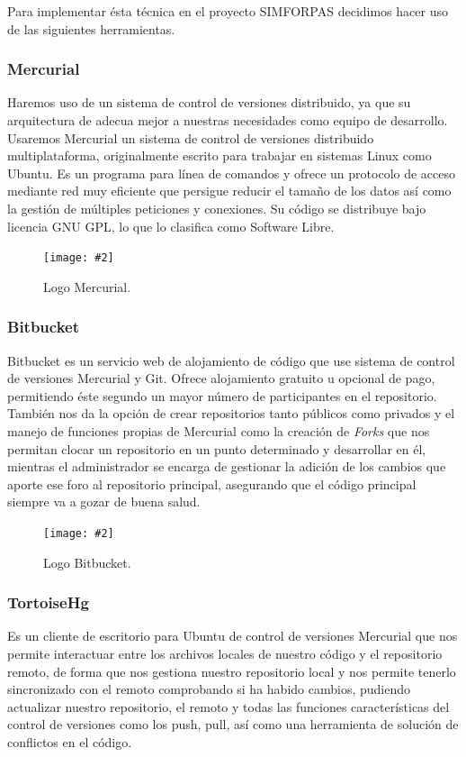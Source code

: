 \documentclass[12pt,a4paper,spanish]{book} %
\newcommand{\imgCentradaPeq}[3]{
\begin{figure}[H]
\begin{center}
\texttt{[image: \#2]}
\caption{#3}
\label{#1}
\end{center}
\end{figure}
}
\begin{document}
Para implementar ésta técnica en el proyecto SIMFORPAS decidimos hacer uso de las siguientes herramientas.

\subsubsection{Mercurial}

Haremos uso de un sistema de control de versiones distribuido, ya que su arquitectura de adecua mejor a nuestras necesidades como equipo de desarrollo. Usaremos Mercurial un sistema de control de versiones distribuido multiplataforma, originalmente escrito para trabajar en sistemas Linux como Ubuntu. Es un programa para línea de comandos y ofrece un protocolo de acceso mediante red muy eficiente que persigue reducir el tamaño de los datos así como la gestión de múltiples peticiones y conexiones. Su código se distribuye bajo licencia GNU GPL, lo que lo clasifica como Software Libre.

\imgCentradaPeq{fig.2.12}{img/mercurial.eps}{Logo Mercurial.}

\newpage
\subsubsection{Bitbucket}

Bitbucket es un servicio web de alojamiento de código que use sistema de control de versiones Mercurial y Git. Ofrece alojamiento gratuito u opcional de pago, permitiendo éste segundo un mayor número de participantes en el repositorio. También nos da la opción de crear repositorios tanto públicos como privados y el manejo de funciones propias de Mercurial como la creación de \emph{Forks} que nos permitan clocar un repositorio en un punto determinado y desarrollar en él, mientras el administrador se encarga de gestionar la adición de los cambios que aporte ese foro al repositorio principal, asegurando que el código principal siempre va a gozar de buena salud.

\imgCentradaPeq{fig.2.13}{img/bitbucket.eps}{Logo Bitbucket.}

\subsubsection{TortoiseHg}

Es un cliente de escritorio para Ubuntu de control de versiones Mercurial que nos permite interactuar entre los archivos locales de nuestro código y el repositorio remoto, de forma que nos gestiona nuestro repositorio local y nos permite tenerlo sincronizado con el remoto comprobando si ha habido cambios, pudiendo actualizar nuestro repositorio, el remoto y todas las funciones características del control de versiones como los push, pull, así como una herramienta de solución de conflictos en el código.
\end{document}
